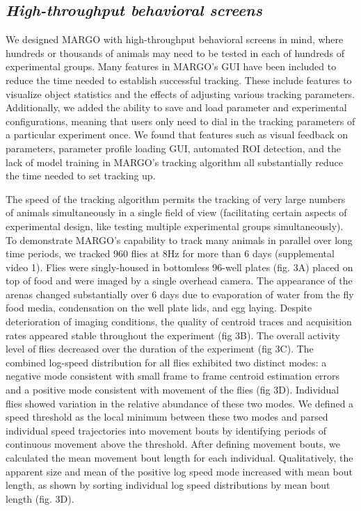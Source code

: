 \documentclass[10pt]{article}
\begin{document}
\begin{multicols}{2}
\subsection*{\textit{High-throughput behavioral screens}}

We designed MARGO with high-throughput behavioral screens in mind, where hundreds or thousands of animals may need to be tested in each of hundreds of experimental groups. Many features in MARGO's GUI have been included to reduce the time needed to establish successful tracking. These include features to visualize object statistics and the effects of adjusting various tracking parameters. Additionally, we added the ability to save and load parameter and experimental configurations, meaning that users only need to dial in the tracking parameters of a particular experiment once. We found that features such as visual feedback on parameters, parameter profile loading GUI, automated ROI detection, and the lack of model training in MARGO's tracking algorithm all substantially reduce the time needed to set tracking up. 

The speed of the tracking algorithm permits the tracking of very large numbers of animals simultaneously in a single field of view (facilitating certain aspects of experimental design, like testing multiple experimental groups simultaneously). To demonstrate MARGO's capability to track many animals in parallel over long time periods, we tracked 960 flies at 8Hz for more than 6 days (supplemental video 1). Flies were singly-housed in bottomless 96-well plates (fig. 3A) placed on top of food and were imaged by a single overhead camera. The appearance of the arenas changed substantially over 6 days due to evaporation of water from the fly food media, condensation on the well plate lids, and egg laying. Despite deterioration of imaging conditions, the quality of centroid traces and acquisition rates appeared stable throughout the experiment (fig 3B). The overall activity level of flies decreased over the duration of the experiment (fig 3C). The combined log-speed distribution for all flies exhibited two distinct modes: a negative mode consistent with small frame to frame centroid estimation errors and a positive mode consistent with movement of the flies (fig 3D). Individual flies showed variation in the relative abundance of these two modes. We defined a speed threshold as the local minimum between these two modes and parsed individual speed trajectories into movement bouts by identifying periods of continuous movement above the threshold. After defining movement bouts, we calculated the mean movement bout length for each individual. Qualitatively, the apparent size and mean of the positive log speed mode increased with mean bout length, as shown by sorting individual log speed distributions by mean bout length (fig. 3D).


\end{multicols}
\end{document}
